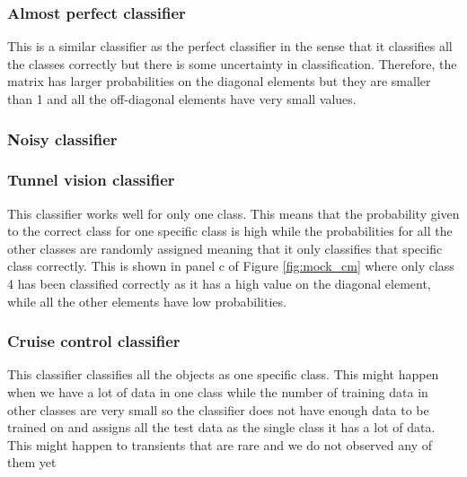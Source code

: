 \subsubsection{Almost perfect classifier}
\label{sec:almost_data}

This is a similar classifier as the perfect classifier in the sense that it classifies all the classes correctly but there is some uncertainty in classification.
Therefore, the matrix has larger probabilities on the diagonal elements but they are smaller than 1 and all the off-diagonal elements have very small values.

\subsubsection{Noisy classifier}
\label{sec:nois_datay}


\subsubsection{Tunnel vision classifier}
\label{sec:tunnel_data}

This classifier works well for only one class.
This means that the probability given to the correct class for one specific class is high while the probabilities for all the other classes are randomly assigned meaning that it only classifies that specific class correctly.
This is shown in panel c of Figure \ref{fig:mock_cm} where only class 4 has been classified correctly as it has a high value on the diagonal element, while all the other elements have low probabilities.

\subsubsection{Cruise control classifier}
\label{sec:cruise_data}

This classifier classifies all the objects as one specific class.
This might happen when we have a lot of data in one class while the number of training data in other classes are very small so the classifier does not have enough data to be trained on and assigns all the test data as the single class it has a lot of data.
This might happen to transients that are rare and we do not observed any of them yet 

